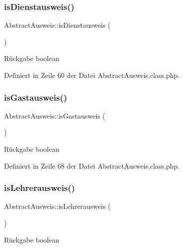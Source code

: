 \subsubsection{\texorpdfstring{is\+Dienstausweis()}{isDienstausweis()}}
{\footnotesize\ttfamily Abstract\+Ausweis\+::is\+Dienstausweis (\begin{DoxyParamCaption}{ }\end{DoxyParamCaption})}

\begin{DoxyReturn}{Rückgabe}
boolean 
\end{DoxyReturn}


Definiert in Zeile 60 der Datei Abstract\+Ausweis.\+class.\+php.

\mbox{\label{class_abstract_ausweis_aad80fe59f398742405e0b1ddb004a014}} 
\subsubsection{\texorpdfstring{is\+Gastausweis()}{isGastausweis()}}
{\footnotesize\ttfamily Abstract\+Ausweis\+::is\+Gastausweis (\begin{DoxyParamCaption}{ }\end{DoxyParamCaption})}

\begin{DoxyReturn}{Rückgabe}
boolean 
\end{DoxyReturn}


Definiert in Zeile 68 der Datei Abstract\+Ausweis.\+class.\+php.

\mbox{\label{class_abstract_ausweis_ac68634e5fea5ede965524abdca0037df}} 
\subsubsection{\texorpdfstring{is\+Lehrerausweis()}{isLehrerausweis()}}
{\footnotesize\ttfamily Abstract\+Ausweis\+::is\+Lehrerausweis (\begin{DoxyParamCaption}{ }\end{DoxyParamCaption})}

\begin{DoxyReturn}{Rückgabe}
boolean 
\end{DoxyReturn}



